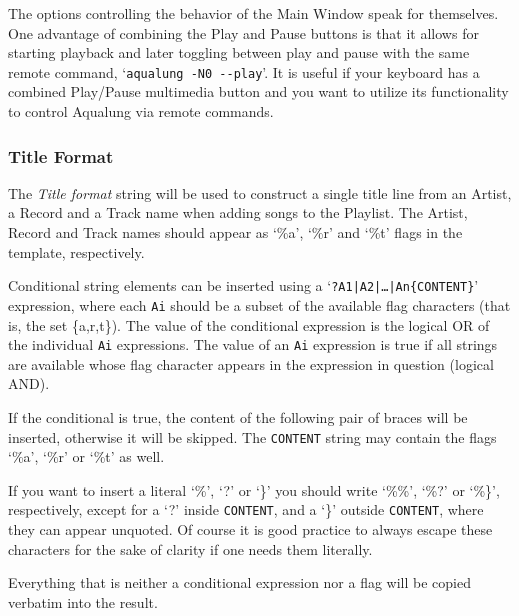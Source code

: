\documentclass[10pt,english]{article}
\begin{document}
\noindent The options controlling the behavior of the Main Window
speak for themselves. One advantage of combining the Play
and Pause buttons is that it allows for starting playback
and later toggling between play and pause with the same
remote command, `\texttt{aqualung -N0 {-}{-}play}'. It is
useful if your keyboard has a combined Play/Pause multimedia
button and you want to utilize its functionality to control
Aqualung via remote commands.




\subsubsection{Title Format\label{idp812336}}



\noindent The \textsl{Title format} string will be used to
construct a single title line from an Artist, a Record and a
Track name when adding songs to the Playlist. The Artist,
Record and Track names should appear as `\%a', `\%r'
and `\%t' flags in the template, respectively.




Conditional string elements can be inserted using a
`\texttt{?A1|A2|\dots{}|An\{CONTENT\}}' expression, where
each \texttt{Ai} should be a subset of the available flag
characters (that is, the set \{a,r,t\}). The value of the
conditional expression is the logical OR of the individual
\texttt{Ai} expressions. The value of an \texttt{Ai}
expression is true if all strings are available whose flag
character appears in the expression in question (logical
AND).




If the conditional is true, the content of the following
pair of braces will be inserted, otherwise it will be
skipped. The \texttt{CONTENT} string may contain the flags
`\%a', `\%r' or `\%t' as well.




If you want to insert a literal `\%', `?' or
`\}' you should write `\%\%', `\%?' or `\%\}',
respectively, except for a `?' inside \texttt{CONTENT},
and a `\}' outside \texttt{CONTENT}, where they can
appear unquoted. Of course it is good practice to always
escape these characters for the sake of clarity if one needs
them literally.




Everything that is neither a conditional expression nor a
flag will be copied verbatim into the result.
\end{document}
